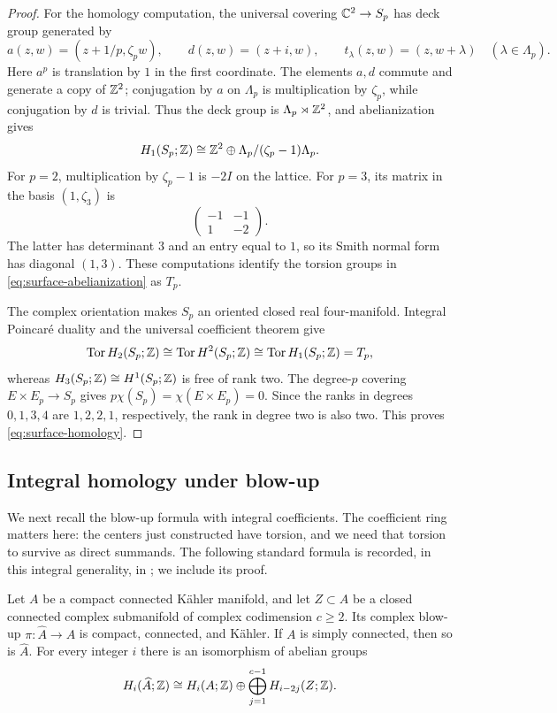 \begin{proof}
For the homology computation, the universal covering $\mathbb C^2\to S_p$
has deck group generated by
\[
 a(z,w)=(z+1/p,\zeta_p w),\qquad
 d(z,w)=(z+i,w),\qquad
 t_\lambda(z,w)=(z,w+\lambda)\quad(\lambda\in\Lambda_p).
\]
Here $a^p$ is translation by $1$ in the first coordinate. The elements
$a,d$ commute and generate a copy of $\mathbb Z^2$; conjugation by $a$ on
$\Lambda_p$ is multiplication by $\zeta_p$, while conjugation by $d$
is trivial. Thus the deck group is $\Lambda_p\rtimes\mathbb Z^2$, and
abelianization gives
\begin{equation}
\label{eq:surface-abelianization}
 H_1(S_p;\mathbb Z)
 \cong\mathbb Z^2\oplus\Lambda_p/(\zeta_p-1)\Lambda_p.
\end{equation}
For $p=2$, multiplication by $\zeta_p-1$ is $-2I$ on the lattice.
For $p=3$, its matrix in the basis $(1,\zeta_3)$ is
\[
 \begin{pmatrix}-1&-1\\1&-2\end{pmatrix}.
\]
The latter has determinant $3$ and an entry equal to $1$, so its Smith
normal form has diagonal $(1,3)$. These computations identify the
torsion groups in \eqref{eq:surface-abelianization} as $T_p$.

The complex orientation makes $S_p$ an oriented closed real
four-manifold. Integral Poincar\'e duality and the universal coefficient
theorem give
\[
 \operatorname{Tor} H_2(S_p;\mathbb Z)\cong\operatorname{Tor} H^2(S_p;\mathbb Z)
 \cong\operatorname{Tor} H_1(S_p;\mathbb Z)=T_p,
\]
whereas $H_3(S_p;\mathbb Z)\cong H^1(S_p;\mathbb Z)$ is free of rank two.
The degree-$p$ covering $E\times E_p\to S_p$ gives
$p\chi(S_p)=\chi(E\times E_p)=0$. Since the ranks in degrees
$0,1,3,4$ are $1,2,2,1$, respectively, the rank in degree two is also
two. This proves \eqref{eq:surface-homology}.
\end{proof}

\subsection{Integral homology under blow-up}

We next recall the blow-up formula with integral coefficients. The
coefficient ring matters here: the centers just constructed have
torsion, and we need that torsion to survive as direct summands. The
following standard formula is recorded, in this integral generality,
in \cite[Theorem~4.1]{DuanLi2009}; we include its proof.

\begin{proposition}
\label{prop:blowup}
Let $A$ be a compact connected K\"ahler manifold, and let $Z\subset A$
be a closed connected complex submanifold of complex codimension
$c\geq2$. Its complex blow-up $\pi:\widehat A\to A$ is compact,
connected, and K\"ahler. If $A$ is simply connected, then so is
$\widehat A$. For every integer $i$ there is an isomorphism of abelian
groups
\begin{equation}
\label{eq:blowup-homology}
 H_i(\widehat A;\mathbb Z)
 \cong H_i(A;\mathbb Z)\oplus
 \bigoplus_{j=1}^{c-1}H_{i-2j}(Z;\mathbb Z).
\end{equation}
\end{proposition}

